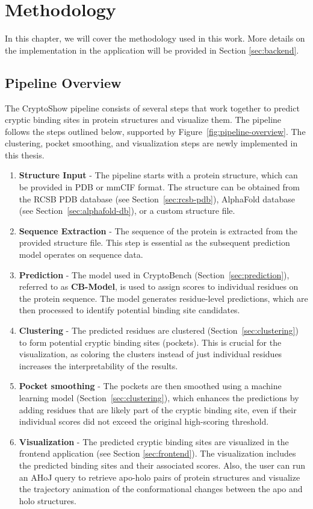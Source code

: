 \chapter{Methodology}
\label{chap:methodology}

In this chapter, we will cover the methodology used in this work. More details on the implementation in the application will be provided in Section \ref{sec:backend}.

\section{Pipeline Overview}
\label{sec:pipeline-overview}

The CryptoShow pipeline consists of several steps that work together to predict cryptic binding sites in protein structures and visualize them. The pipeline follows the steps outlined below, supported by Figure~\ref{fig:pipeline-overview}. The clustering, pocket smoothing, and visualization steps are newly implemented in this thesis.

\begin{enumerate}
    \item \textbf{Structure Input} - The pipeline starts with a protein structure, which can be provided in PDB or mmCIF format. The structure can be obtained from the RCSB PDB database (see Section~\ref{sec:rcsb-pdb}), AlphaFold database (see Section~\ref{sec:alphafold-db}), or a custom structure file.
    \item \textbf{Sequence Extraction} - The sequence of the protein is extracted from the provided structure file. This step is essential as the subsequent prediction model operates on sequence data.
    \item \textbf{Prediction} - The model used in CryptoBench (Section~\ref{sec:prediction}), referred to as \textbf{CB-Model}, is used to assign scores to individual residues on the protein sequence. The model generates residue-level predictions, which are then processed to identify potential binding site candidates.
    \item \textbf{Clustering} - The predicted residues are clustered (Section~\ref{sec:clustering}) to form potential cryptic binding sites (pockets). This is crucial for the visualization, as coloring the clusters instead of just individual residues increases the interpretability of the results.
    \item \textbf{Pocket smoothing} - The pockets are then smoothed using a machine learning model (Section~\ref{sec:clustering}), which enhances the predictions by adding residues that are likely part of the cryptic binding site, even if their individual scores did not exceed the original high-scoring threshold.
    \item \textbf{Visualization} - The predicted cryptic binding sites are visualized in the frontend application (see Section \ref{sec:frontend}). The visualization includes the predicted binding sites and their associated scores. Also, the user can run an AHoJ query to retrieve apo-holo pairs of protein structures and visualize the trajectory animation of the conformational changes between the apo and holo structures.
\end{enumerate}

